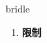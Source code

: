 
\begin{frame}
{\huge bridle}
\begin{center}
\begin{enumerate}\Large
  \item \textbf{限制}
\end{enumerate}
\end{center}
\end{frame}
